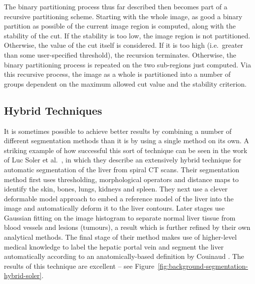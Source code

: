 The binary partitioning process thus far described then becomes part of a recursive partitioning scheme. Starting with the whole image, as good a binary partition as possible of the current image region is computed, along with the stability of the cut. If the stability is too low, the image region is not partitioned. Otherwise, the value of the cut itself is considered. If it is too high (i.e.~greater than some user-specified threshold), the recursion terminates. Otherwise, the binary partitioning process is repeated on the two sub-regions just computed. Via this recursive process, the image as a whole is partitioned into a number of groups dependent on the maximum allowed cut value and the stability criterion.

\subsection{Hybrid Techniques}

It is sometimes possible to achieve better results by combining a number of different segmentation methods than it is by using a single method on its own. A striking example of how successful this sort of technique can be seen in the work of Luc Soler et al.\ \cite{soler01}, in which they describe an extensively hybrid technique for automatic segmentation of the liver from spiral CT scans. Their segmentation method first uses thresholding, morphological operators and distance maps to identify the skin, bones, lungs, kidneys and spleen. They next use a clever deformable model approach to embed a reference model of the liver into the image and automatically deform it to the liver contours. Later stages use Gaussian fitting on the image histogram to separate normal liver tissue from blood vessels and lesions (tumours), a result which is further refined by their own analytical methods. The final stage of their method makes use of higher-level medical knowledge to label the hepatic portal vein and segment the liver automatically according to an anatomically-based definition by Couinaud \cite{couinaud57}. The results of this technique are excellent -- see Figure~\ref{fig:background-segmentation-hybrid-soler}.


